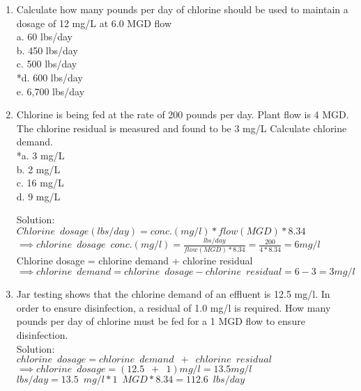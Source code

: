 \documentclass{article}
\begin{document}
\begin{enumerate}
\item Calculate how many pounds per day of chlorine should be used to maintain a dosage of 12 mg/L at 6.0 MGD flow\\

a. 60 lbs/day \\
b. 450 lbs/day \\
c. 500 lbs/day \\
*d. 600 lbs/day \\
e. 6,700 lbs/day 

\item Chlorine is being fed at the rate of 200 pounds per day. Plant flow is 4 MGD. The chlorine residual is measured and found to be 3 mg/L Calculate chlorine demand.\\

\vspace{0.5cm}
*a. 3 mg/L \\
b. 2 mg/L \\
c. 16 mg/L \\
d. 9 mg/L \\

\vspace{0.5cm}

Solution:\\
$Chlorine \enspace dosage (lbs/day)=conc. (mg/l)*flow(MGD)*8.34$\\
$\implies chlorine \enspace dosage \enspace conc. (mg/l)=\frac{lbs/day}{flow(MGD)*8.34}=\frac{200}{4*8.34}=6mg/l$\\
\vspace{0.5cm}
Chlorine dosage = chlorine demand + chlorine residual\\
$ \implies chlorine \enspace demand = chlorine \enspace dosage - chlorine \enspace residual=6-3=\boxed{3mg/l}$

\item Jar testing shows that the chlorine demand of an effluent is 12.5 mg/l. In order to ensure disinfection, a residual of 1.0 mg/l is required. How many pounds per day of chlorine must be fed for a 1 MGD flow to ensure disinfection.\\
\vspace{0.3cm}
Solution:\\
\vspace{0.3cm}
$ chlorine \enspace dosage = chlorine \enspace demand \enspace + \enspace chlorine \enspace residual$\\
$\implies chlorine \enspace dosage = (12.5 \enspace + \enspace 1 )mg/l=13.5 mg/l$\\
$lbs/day=13.5 \enspace mg/l*1 \enspace MGD*8.34=\boxed{112.6 \enspace lbs/day}$



\end{enumerate}
\end{document}
